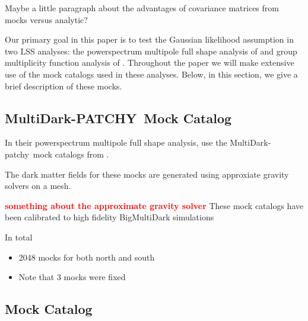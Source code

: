 \documentclass[12pt, letterpaper, preprint]{aastex}
\newcommand{\bitem}{\begin{itemize}}
\newcommand{\eitem}{\end{itemize}}
\newcommand{\todo}[1]{{\bf \textcolor{red}{#1}}}
\newcommand{\patchy}{{\fontshape\scdefault\selectfont patchy}}
\begin{document}
Maybe a little paragraph about the advantages of covariance matrices from 
mocks versus analytic? 

Our primary goal in this paper is to test the Gaussian likelihood assumption 
in two LSS analyses: the powerspectrum multipole full shape analysis of \cite{beutler2017} 
and group multiplicity function analysis of \cite{sinha2017}. Throughout
the paper we will make extensive use of the mock catalogs used in these 
analyses. Below, in this section, we give a brief description of these mocks. 

\subsection{MultiDark-PATCHY~Mock Catalog} 
In their powerspectrum multipole full shape analysis, \cite{beutler2017}
use the MultiDark-\patchy~mock catalogs from \cite{kitaura2016}. 


The dark matter fields for these mocks are generated using approxiate
gravity solvers on a mesh. 


\todo{something about the approximate gravity solver} 
These mock catalogs have been calibrated to high fidelity BigMultiDark 
simulations~\citep{rodriguez-torres2016, klypin2016}

In total \cite{beutler2017} 


\bitem
    \item 2048 mocks for both north and south 
    \item Note that 3 mocks were fixed
\eitem

\subsection{\cite{sinha2017} Mock Catalog}
\end{document}
